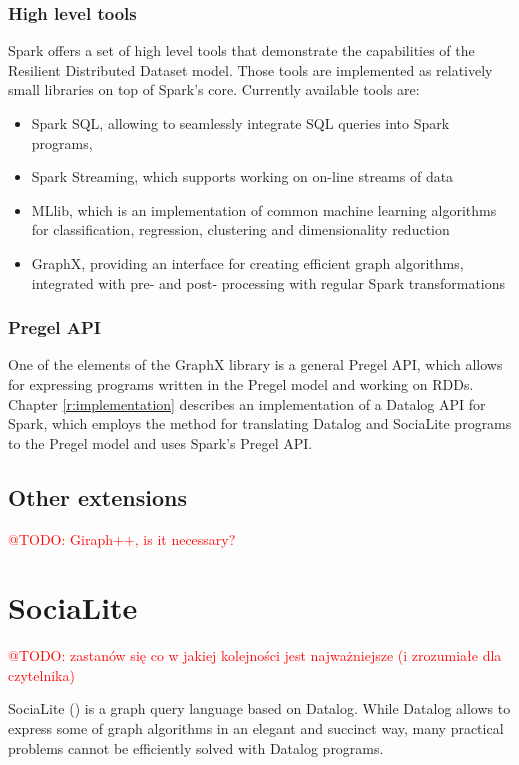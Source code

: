 \documentclass{pracamgr}
\makeatletter
\theoremstyle{plain}
\theoremstyle{definition}
\theoremstyle{remark}
\newcommand{\todo}[1]{\textcolor{red}{@TODO: #1}}
\makeatother
\begin{document}
\subsection{High level tools}
Spark offers a set of high level tools that demonstrate the capabilities of the Resilient Distributed Dataset model. Those tools are implemented as relatively small libraries on top of Spark's core. Currently available tools are:
\begin{itemize}
\item Spark SQL, allowing to seamlessly integrate SQL queries into Spark programs,
\item Spark Streaming, which supports working on on-line streams of data
\item MLlib, which is an implementation of common machine learning algorithms for classification, regression, clustering and dimensionality reduction
\item GraphX, providing an interface for creating efficient graph algorithms, integrated with pre- and post- processing with regular Spark transformations
\end{itemize}

\subsection{Pregel API}
One of the elements of the GraphX library is a general Pregel API, which allows for expressing programs written in the Pregel model and working on RDDs.
Chapter \ref{r:implementation} describes an implementation of a Datalog API for Spark, which employs the method for translating Datalog and SociaLite programs to the Pregel model and uses Spark's Pregel API.

\section{Other extensions}
\todo{Giraph++, is it necessary?}



\chapter{SociaLite}\label{r:socialite}

\todo{zastanów się co w jakiej kolejności jest najważniejsze (i zrozumiałe dla czytelnika)}

SociaLite (\cite{socialite, distsoc}) is a graph query language based on Datalog. While Datalog allows to express some of graph algorithms
in an elegant and succinct way, many practical problems cannot be efficiently solved with Datalog programs. 
\end{document}
